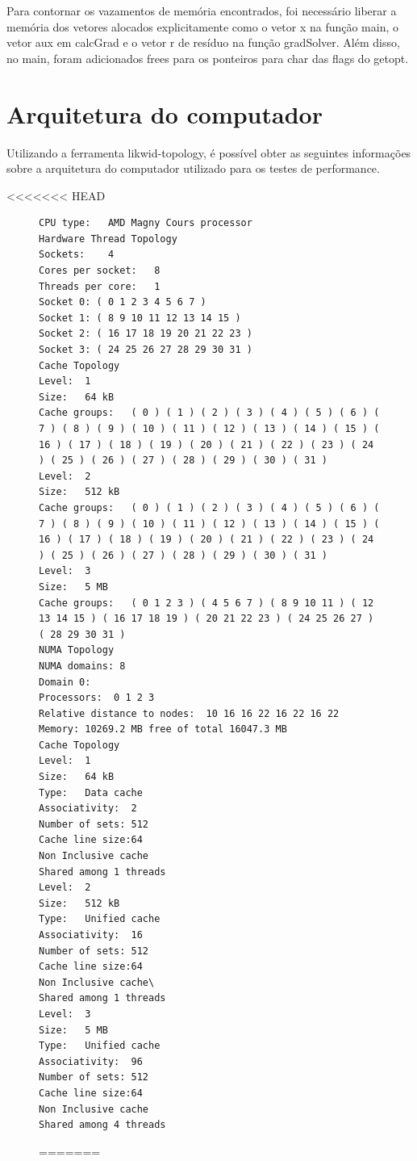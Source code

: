 \documentclass[12pt]{article}
\begin{document}
Para contornar os vazamentos de memória encontrados, foi necessário liberar a
memória dos vetores alocados explicitamente como o vetor x na função main, o
vetor aux em calcGrad e o vetor r de resíduo na função gradSolver. Além disso,
no main, foram adicionados frees para os ponteiros para char das flags do
getopt.

\section{Arquitetura do computador}\label{sec:likwid}

Utilizando a ferramenta likwid-topology, é possível obter as seguintes
informações sobre a arquitetura do computador utilizado para os testes de
performance.

<<<<<<< HEAD
\begin{figure}[ht]\footnotesize
\begin{verbatim}
CPU type:	AMD Magny Cours processor
Hardware Thread Topology
Sockets:	4 
Cores per socket:	8 
Threads per core:	1 
Socket 0: ( 0 1 2 3 4 5 6 7 )
Socket 1: ( 8 9 10 11 12 13 14 15 )
Socket 2: ( 16 17 18 19 20 21 22 23 )
Socket 3: ( 24 25 26 27 28 29 30 31 )
Cache Topology
Level:	1
Size:	64 kB
Cache groups:	( 0 ) ( 1 ) ( 2 ) ( 3 ) ( 4 ) ( 5 ) ( 6 ) ( 7 ) ( 8 ) ( 9 ) ( 10 ) ( 11 ) ( 12 ) ( 13 ) ( 14 ) ( 15 ) ( 16 ) ( 17 ) ( 18 ) ( 19 ) ( 20 ) ( 21 ) ( 22 ) ( 23 ) ( 24 ) ( 25 ) ( 26 ) ( 27 ) ( 28 ) ( 29 ) ( 30 ) ( 31 )
Level:	2
Size:	512 kB
Cache groups:	( 0 ) ( 1 ) ( 2 ) ( 3 ) ( 4 ) ( 5 ) ( 6 ) ( 7 ) ( 8 ) ( 9 ) ( 10 ) ( 11 ) ( 12 ) ( 13 ) ( 14 ) ( 15 ) ( 16 ) ( 17 ) ( 18 ) ( 19 ) ( 20 ) ( 21 ) ( 22 ) ( 23 ) ( 24 ) ( 25 ) ( 26 ) ( 27 ) ( 28 ) ( 29 ) ( 30 ) ( 31 )
Level:	3
Size:	5 MB
Cache groups:	( 0 1 2 3 ) ( 4 5 6 7 ) ( 8 9 10 11 ) ( 12 13 14 15 ) ( 16 17 18 19 ) ( 20 21 22 23 ) ( 24 25 26 27 ) ( 28 29 30 31 )
NUMA Topology
NUMA domains: 8 
Domain 0:
Processors:  0 1 2 3
Relative distance to nodes:  10 16 16 22 16 22 16 22
Memory: 10269.2 MB free of total 16047.3 MB
Cache Topology
Level:	1
Size:	64 kB
Type:	Data cache
Associativity:	2
Number of sets:	512
Cache line size:64
Non Inclusive cache
Shared among 1 threads
Level:	2
Size:	512 kB
Type:	Unified cache
Associativity:	16
Number of sets:	512
Cache line size:64
Non Inclusive cache\
Shared among 1 threads
Level:	3
Size:	5 MB
Type:	Unified cache
Associativity:	96
Number of sets:	512
Cache line size:64
Non Inclusive cache
Shared among 4 threads
\end{verbatim}\caption{Saída do likwid-topology}\label{fig:topologyOut}
=======
\begin{figure}[ht]

\end{figure}
\end{figure}
\end{document}
